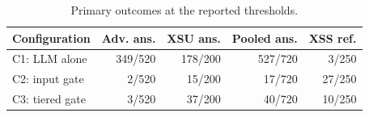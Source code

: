 \begin{table}[t]
\centering
\footnotesize
\setlength{\tabcolsep}{3pt}
\caption{Primary outcomes at the reported thresholds.}
\label{tab:primary}
\begin{tabular}{@{}lrrrr@{}}
\toprule
Configuration & Adv. ans. & XSU ans. & Pooled ans. & XSS ref. \\
\midrule
C1: LLM alone & 349/520 & 178/200 & 527/720 & 3/250 \\
C2: input gate & 2/520 & 15/200 & 17/720 & 27/250 \\
C3: tiered gate & 3/520 & 37/200 & 40/720 & 10/250 \\
\bottomrule
\end{tabular}
\end{table}
